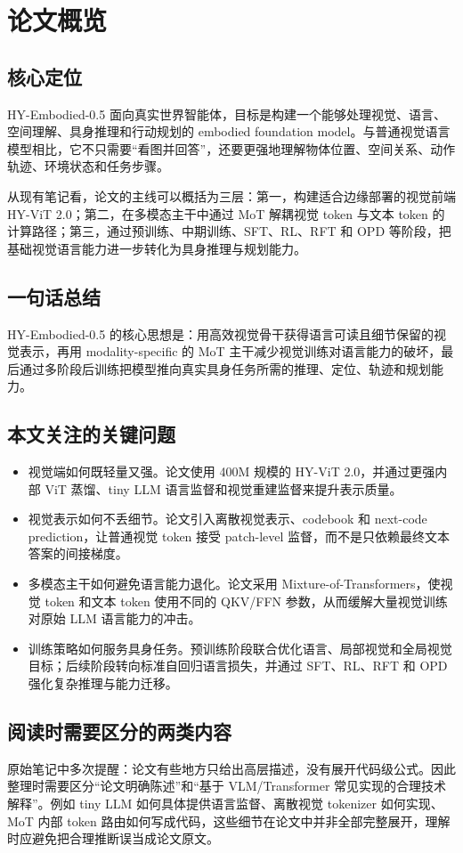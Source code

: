 \section{论文概览}

\subsection{核心定位}

HY-Embodied-0.5 面向真实世界智能体，目标是构建一个能够处理视觉、语言、空间理解、具身推理和行动规划的 embodied foundation model。与普通视觉语言模型相比，它不只需要“看图并回答”，还要更强地理解物体位置、空间关系、动作轨迹、环境状态和任务步骤。

从现有笔记看，论文的主线可以概括为三层：第一，构建适合边缘部署的视觉前端 HY-ViT 2.0；第二，在多模态主干中通过 MoT 解耦视觉 token 与文本 token 的计算路径；第三，通过预训练、中期训练、SFT、RL、RFT 和 OPD 等阶段，把基础视觉语言能力进一步转化为具身推理与规划能力。

\subsection{一句话总结}

HY-Embodied-0.5 的核心思想是：用高效视觉骨干获得语言可读且细节保留的视觉表示，再用 modality-specific 的 MoT 主干减少视觉训练对语言能力的破坏，最后通过多阶段后训练把模型推向真实具身任务所需的推理、定位、轨迹和规划能力。

\subsection{本文关注的关键问题}

\begin{itemize}
    \item 视觉端如何既轻量又强。论文使用 400M 规模的 HY-ViT 2.0，并通过更强内部 ViT 蒸馏、tiny LLM 语言监督和视觉重建监督来提升表示质量。
    \item 视觉表示如何不丢细节。论文引入离散视觉表示、codebook 和 next-code prediction，让普通视觉 token 接受 patch-level 监督，而不是只依赖最终文本答案的间接梯度。
    \item 多模态主干如何避免语言能力退化。论文采用 Mixture-of-Transformers，使视觉 token 和文本 token 使用不同的 QKV/FFN 参数，从而缓解大量视觉训练对原始 LLM 语言能力的冲击。
    \item 训练策略如何服务具身任务。预训练阶段联合优化语言、局部视觉和全局视觉目标；后续阶段转向标准自回归语言损失，并通过 SFT、RL、RFT 和 OPD 强化复杂推理与能力迁移。
\end{itemize}

\subsection{阅读时需要区分的两类内容}

原始笔记中多次提醒：论文有些地方只给出高层描述，没有展开代码级公式。因此整理时需要区分“论文明确陈述”和“基于 VLM/Transformer 常见实现的合理技术解释”。例如 tiny LLM 如何具体提供语言监督、离散视觉 tokenizer 如何实现、MoT 内部 token 路由如何写成代码，这些细节在论文中并非全部完整展开，理解时应避免把合理推断误当成论文原文。
